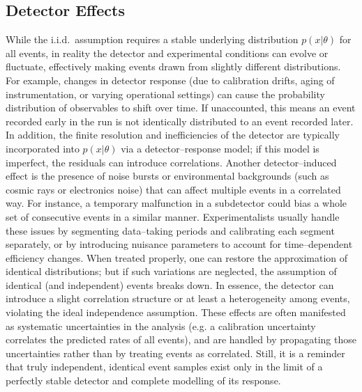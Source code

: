     \subsection{Detector Effects}
        While the i.i.d.\ assumption requires a stable underlying distribution $p(x|\theta)$ for all events, in reality the detector and experimental conditions can evolve or fluctuate, effectively making events drawn from slightly different distributions.
        For example, changes in detector response (due to calibration drifts, aging of instrumentation, or varying operational settings) can cause the probability distribution of observables to shift over time.
        If unaccounted, this means an event recorded early in the run is not identically distributed to an event recorded later.
        In addition, the finite resolution and inefficiencies of the detector are typically incorporated into $p(x|\theta)$ via a detector--response model;
        if this model is imperfect, the residuals can introduce correlations.
        Another detector--induced effect is the presence of noise bursts or environmental backgrounds (such as cosmic rays or electronics noise) that can affect multiple events in a correlated way.
        For instance, a temporary malfunction in a subdetector could bias a whole set of consecutive events in a similar manner.
        Experimentalists usually handle these issues by segmenting data--taking periods and calibrating each segment separately, or by introducing nuisance parameters to account for time--dependent efficiency changes.
        When treated properly, one can restore the approximation of identical distributions;
        but if such variations are neglected, the assumption of identical (and independent) events breaks down.
        In essence, the detector can introduce a slight correlation structure or at least a heterogeneity among events, violating the ideal independence assumption.
        These effects are often manifested as systematic uncertainties in the analysis (e.g. a calibration uncertainty correlates the predicted rates of all events), and are handled by propagating those uncertainties rather than by treating events as correlated.
        Still, it is a reminder that truly independent, identical event samples exist only in the limit of a perfectly stable detector and complete modelling of its response.

    
